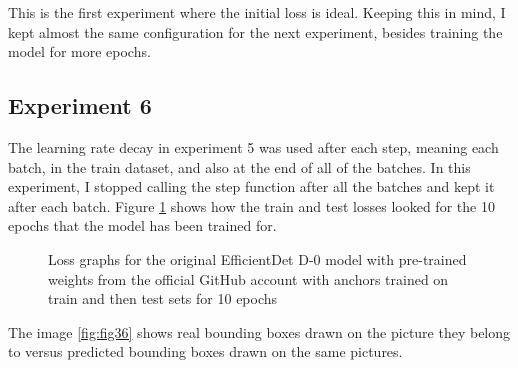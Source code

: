 This is the first experiment where the initial loss is ideal. Keeping this in mind, I kept almost the same configuration for the next experiment, besides training the model for more epochs.

\subsection{Experiment 6}

The learning rate decay in experiment 5 was used after each step, meaning each batch, in the train dataset, and also at the end of all of the batches. In this experiment, I stopped calling the step function after all the batches and kept it after each batch. Figure \ref{fig:fig35} shows how the train and test losses looked for the 10 epochs that the model has been trained for.

\begin{figure}[ht]
    \label{fig:fig35}
    \caption{Loss graphs for the original EfficientDet D-0 model with pre-trained weights from the official GitHub account with anchors trained on train and then test sets for 10 epochs}
\end{figure}

The image \ref{fig:fig36} shows real bounding boxes drawn on the picture they belong to versus predicted bounding boxes drawn on the same pictures.

